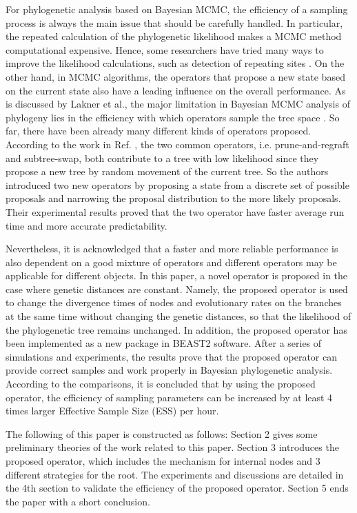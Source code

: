 \documentclass{bmcart}
\begin{document}
For phylogenetic analysis based on Bayesian MCMC, the efficiency of a sampling process is always the main issue that should be carefully handled. In particular, the repeated calculation of the phylogenetic likelihood makes a MCMC method computational expensive. Hence, some researchers have tried many ways to improve the likelihood calculations, such as detection of repeating sites \cite{kobert2017efficient}. On the other hand, in MCMC algorithms, the operators that propose a new state based on the current state also have a leading influence on the overall performance. As is discussed by Lakner et al., the major limitation in Bayesian MCMC analysis of phylogeny lies in the efficiency with which operators sample the tree space \cite{lakner2008efficiency}. So far, there have been already many different kinds of operators proposed. According to the work in Ref. \cite{hohna2011guided}, the two common operators, i.e. prune-and-regraft and subtree-swap, both contribute to a tree with low likelihood since they propose a new tree by random movement of the current tree. So the authors introduced two new operators by proposing a state from a discrete set of possible proposals and narrowing the proposal distribution to the more likely proposals. Their experimental results proved that the two operator have faster average run time and more accurate predictability.

Nevertheless, it is acknowledged that a faster and more reliable performance is also dependent on a good mixture of operators and different operators may be applicable for different objects. In this paper, a novel operator is proposed in the case where genetic distances are constant. Namely, the proposed operator is used to change the divergence times of nodes and evolutionary rates on the branches at the same time without changing the genetic distances, so that the likelihood of the phylogenetic tree remains unchanged. In addition, the proposed operator has been implemented as a new package in BEAST2 software. After a series of simulations and experiments, the results prove that the proposed operator can provide correct samples  and work properly in Bayesian phylogenetic analysis. According to the comparisons, it is concluded that by using the proposed operator, the efficiency of sampling parameters can be increased by at least 4 times larger Effective Sample Size (ESS) per hour.

The following of this paper is constructed as follows: Section 2 gives some preliminary theories of the work related to this paper. Section 3 introduces the proposed operator, which includes the mechanism for internal nodes and 3 different strategies for the root. The experiments and discussions are detailed in the 4th section to validate the efficiency of the proposed operator. Section 5 ends the paper with a short conclusion.
\end{document}
